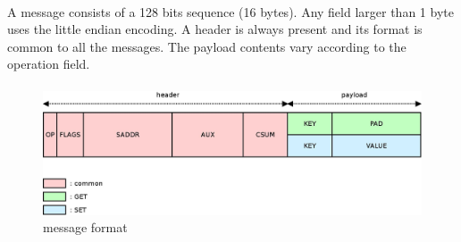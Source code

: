 \documentclass[a4paper, 11pt]{article}
\begin{document}
\paragraph{}
A message consists of a 128 bits sequence (16 bytes). Any field larger than 1
byte uses the little endian encoding. A header is always present and its format
is common to all the messages. The payload contents vary according to the operation
field.

\paragraph{}
\begin{figure}[!h]
\begin{center}
\includegraphics[scale=0.2]{../dia/msg_format/main.jpeg}
\end{center}
\caption{\tiny{message format}}
\label{msg_format}
\end{figure}
\end{document}
